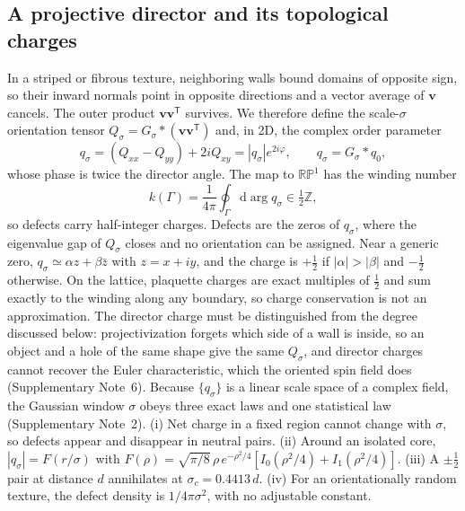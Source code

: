 \documentclass[11pt,a4paper]{article}
\newcommand{\vv}{\bm v}
\newcommand{\dd}{\mathrm{d}}
\newcommand{\RP}{\mathbb{RP}}
\begin{document}
\subsection*{A projective director and its topological charges}
In a striped or fibrous texture, neighboring walls bound domains of opposite sign, so their inward normals point in opposite directions and a vector average of $\vv$ cancels. The outer product $\vv\vv^{\mathsf T}$ survives. We therefore define the scale-$\sigma$ orientation tensor $Q_\sigma=G_\sigma*(\vv\vv^{\mathsf T})$ and, in 2D, the complex order parameter
\begin{equation}
q_\sigma=(Q_{xx}-Q_{yy})+2iQ_{xy}=|q_\sigma|e^{2i\varphi},\qquad q_\sigma=G_\sigma*q_0 ,
\label{eq:q}
\end{equation}
whose phase is twice the director angle. The map to $\RP^1$ has the winding number
\begin{equation}
k(\Gamma)=\frac1{4\pi}\oint_\Gamma\dd\arg q_\sigma\in\tfrac12\mathbb Z ,
\label{eq:charge}
\end{equation}
so defects carry half-integer charges. Defects are the zeros of $q_\sigma$, where the eigenvalue gap of $Q_\sigma$ closes and no orientation can be assigned. Near a generic zero, $q_\sigma\simeq\alpha z+\beta\bar z$ with $z=x+iy$, and the charge is $+\tfrac12$ if $|\alpha|>|\beta|$ and $-\tfrac12$ otherwise. On the lattice, plaquette charges are exact multiples of $\tfrac12$ and sum exactly to the winding along any boundary, so charge conservation is not an approximation. The director charge must be distinguished from the degree discussed below: projectivization forgets which side of a wall is inside, so an object and a hole of the same shape give the same $Q_\sigma$, and director charges cannot recover the Euler characteristic, which the oriented spin field does (Supplementary Note~6). Because $\{q_\sigma\}$ is a linear scale space of a complex field, the Gaussian window $\sigma$ obeys three exact laws and one statistical law (Supplementary Note~2). (i) Net charge in a fixed region cannot change with $\sigma$, so defects appear and disappear in neutral pairs. (ii) Around an isolated core, $|q_\sigma|=F(r/\sigma)$ with $F(\rho)=\sqrt{\pi/8}\,\rho\,e^{-\rho^2/4}[I_0(\rho^2/4)+I_1(\rho^2/4)]$. (iii) A $\pm\tfrac12$ pair at distance $d$ annihilates at $\sigma_c=0.4413\,d$. (iv) For an orientationally random texture, the defect density is $1/4\pi\sigma^2$, with no adjustable constant\cite{Berry2000}.
\end{document}

